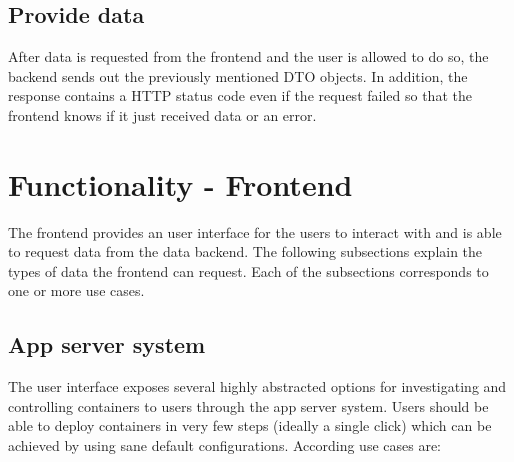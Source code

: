 \documentclass[a4paper,12pt,chapterprefix=false,bibliography=totoc,listof=totoc,]{scrreprt}
\begin{document}
\subsection{Provide data}
After data is requested from the frontend and the user is allowed to do so, the backend sends out the previously mentioned DTO objects. In addition, the response contains a HTTP status code even if the request failed so that the frontend knows if it just received data or an error.

\section{Functionality - Frontend}


The frontend provides an user interface for the users to interact with and is able to request data from the data backend. The following subsections explain the types of data the frontend can request. Each of the subsections corresponds to one or more use cases.




\subsection{{App server system}}
The user interface exposes several highly abstracted options for investigating and controlling containers to users through the app server system. Users should be able to deploy containers in very few steps (ideally a single click) which can be achieved by using sane default configurations. According use cases are:
\end{document}
